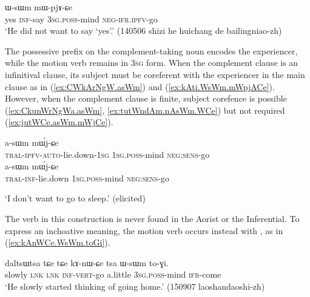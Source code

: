 \begin{exe}
\ex  \label{ex:kAti.WsWm.mWpjACe}
\gll [``ɣa" kɤ-ti] ɯ-sɯm mɯ-pjɤ-ɕe \\
yes \textsc{inf}-say \textsc{3sg}.\textsc{poss}-mind \textsc{neg}-\textsc{ifr}.\textsc{ipfv}-go \\
\glt `He did not want to say `yes'.' (140506 shizi he huichang de bailingniao-zh)
\end{exe}

The possessive prefix on the com\-ple\-ment-taking noun encodes the experiencer, while the motion verb  remains in \textsc{3sg} form. When the complement clause is an infinitival clause, its subject must be coreferent with the experiencer in the main clause as in (\ref{ex:CWkArNgW.asWm}) and (\ref{ex:kAti.WsWm.mWpjACe}). However, when the complement clause is finite, subject corefence is possible (\ref{ex:CkunWrNgWa.asWm}, \ref{ex:tutWndAm.nAsWm.WCe}) but not required (\ref{ex:jutWCe.asWm.mWjCe}).

\begin{exe}
\ex 
\begin{xlist}
\ex  \label{ex:CkunWrNgWa.asWm}
\gll [ɕ-ku-nɯ-rŋgɯ-a] a-sɯm mɯ́j-ɕe \\
\textsc{tral}-\textsc{ipfv}-\textsc{auto}-lie.down-\textsc{1sg} \textsc{1sg}.\textsc{poss}-mind \textsc{neg}:\textsc{sens}-go \\
\ex  \label{ex:CWkArNgW.asWm}
\gll [ɕɯ-kɤ-rŋgɯ] a-sɯm mɯ́j-ɕe \\
\textsc{tral}-\textsc{inf}-lie.down \textsc{1sg}.\textsc{poss}-mind \textsc{neg}:\textsc{sens}-go \\
\end{xlist}
\glt `I don't want to go to sleep.' (elicited)
\end{exe}

The verb  in this construction is never found in the Aorist or the Inferential. To express an inchoative meaning, the motion verb  occurs instead with , as in (\ref{ex:kAnWCe.WsWm.toGi}).

\begin{exe}
\ex  \label{ex:kAnWCe.WsWm.toGi}
\gll daltsɯtsa tɕe tɕe kɤ-nɯ-ɕe tsa ɯ-sɯm to-ɣi.  \\
slowly \textsc{lnk} \textsc{lnk} \textsc{inf}-\textsc{vert}-go a.little \textsc{3sg}.\textsc{poss}-mind \textsc{ifr}-come \\
\glt `He slowly started thinking of going home.' (150907 laoshandaoshi-zh)
\end{exe}

